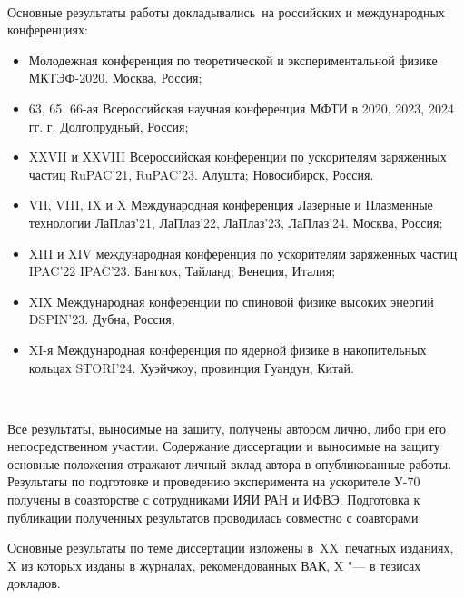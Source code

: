 ~\\
\par {\probation}
Основные результаты работы докладывались~на российских и международных конференциях: 
\begin{itemize}
\item Молодежная конференция по теоретической и экспериментальной физике МКТЭФ-2020. Москва, Россия;
\item 63, 65, 66-ая Всероссийская научная конференция МФТИ в 2020, 2023, 2024 гг. г. Долгопрудный,
Россия;
\item XXVII и XXVIII Всероссийская конференции по ускорителям заряженных частиц RuPAC'21, RuPAC'23. Алушта; Новосибирск, Россия.
\item VII, VIII, IX и X Международная конференция Лазерные и Плазменные технологии ЛаПлаз'21, ЛаПлаз'22, ЛаПлаз'23, ЛаПлаз'24. Москва, Россия;
\item XIII и XIV международная конференция по ускорителям заряженных частиц IPAC'22 IPAC'23. Бангкок, Тайланд; Венеция, Италия;
\item XIX Международная конференции по спиновой физике высоких энергий DSPIN'23. Дубна, Россия;
\item XI-я Международная конференция по ядерной физике в накопительных кольцах STORI’24. Хуэйчжоу, провинция Гуандун, Китай.
\end{itemize}
~\\
\par {\contribution} Все результаты, выносимые на защиту, получены автором лично, либо при его непосредственном участии. Содержание диссертации и выносимые на защиту основные положения отражают личный вклад автора в опубликованные работы. Результаты по подготовке и проведению эксперимента на ускорителе У-70 получены в соавторстве с сотрудниками ИЯИ РАН и ИФВЭ. Подготовка к публикации полученных результатов проводилась совместно с соавторами.
~\\
\par {}
{%
 {\publications} Основные результаты по теме диссертации изложены
    в~XX~печатных изданиях,
    X из которых изданы в журналах, рекомендованных ВАК,
    X "--- в тезисах докладов.
}%
